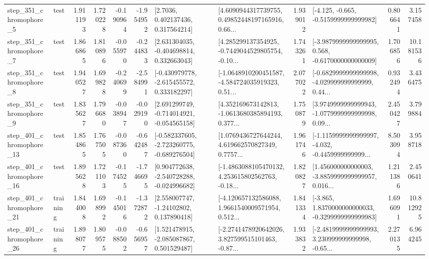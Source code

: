 \begin{tabular}{llrrrrllrlrr}
   step\_351\_chromophore\_5 &      test &      1.911193 &    1.720228 &     -0.190964 & -1.954952 &          [2.7036, 0.402137436, 0.317564214] &  [4.6090944317739755, 0.49852448197165916, 0.66... &       1.939012 &              [-4.125, -0.665, -0.5159999999999982] &            0.806641 &          3.157458 \\
   step\_351\_chromophore\_7 &      test &      1.866865 &    1.810896 &     -0.055970 & -0.244833 &    [2.631304035, -0.404698814, 0.332663043] &  [4.285299137354925, -0.7449044529805754, -0.10... &       1.743261 &  [-3.9879999999999995, 0.568, -0.6170000000000009] &            1.706856 &         10.181536 \\
   step\_351\_chromophore\_8 &      test &      1.940527 &    1.699828 &     -0.240699 & -2.584991 &   [-0.430979778, -2.615455572, 0.333182297] &  [-1.0648910200451587, -4.584724035919323, 0.51... &       2.077022 &  [-0.6829999999999998, -4.029999999999999, 0.44... &            0.932494 &          3.436475 \\
   step\_351\_chromophore\_9 &      test &      1.835627 &    1.796680 &     -0.038947 & -0.029190 &   [2.691299749, -0.714014921, -0.054565158] &  [4.352169673142813, -1.0613680385894193, 0.377... &       1.750879 &  [3.9749999999999943, -1.0779999999999998, 0.09... &            2.450427 &          3.799884 \\
  step\_401\_chromophore\_13 &      test &      1.854865 &    1.767505 &     -0.087360 & -0.642487 &  [-0.582337605, -2.723260775, -0.689276504] &  [1.0769436727644244, 4.619662570827349, 0.7757... &       1.961746 &  [-1.1159999999999997, -4.032, -0.4459999999999... &            8.503094 &          3.958718 \\
  step\_401\_chromophore\_16 &      test &      1.895628 &    1.721103 &     -0.174525 & -1.746695 &   [0.904772638, -2.540728288, -0.024996682] &  [-1.4863088105470132, 4.253615802562763, -0.18... &       1.820827 &  [1.456000000000003, -3.8859999999999957, 0.016... &            1.211386 &          2.450641 \\
  step\_401\_chromophore\_21 &  training &      1.844008 &    1.698992 &     -0.145016 & -1.372872 &     [2.558007747, -1.24102802, 0.137890418] &  [-4.120657132586088, 1.9661540009571954, 0.512... &       1.841334 &  [-3.865, 1.8370000000000033, -0.3299999999999983] &            1.696091 &         10.812925 \\
  step\_401\_chromophore\_26 &  training &      1.898077 &    1.809575 &     -0.088502 & -0.656957 &    [1.521478915, -2.085087867, 0.501529487] &  [-2.2741478920642026, 3.827599515101463, -0.87... &       1.933832 &  [-2.4819999999999993, 3.230999999999998, -0.65... &            2.270135 &          6.964245 \\

\end{tabular}
